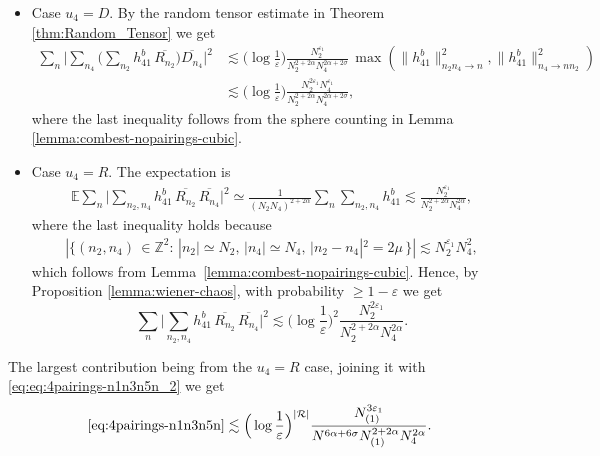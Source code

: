 \documentclass[11pt, xcolor = dvipsnames,reqno
]{amsart}
\theoremstyle{definition}
\theoremstyle{remark}
\begin{document}
    \begin{itemize}
        \item Case $u_4 = D$. By the random tensor estimate in Theorem \ref{thm:Random_Tensor}
        we get
        \begin{align}
            \sum_n \bigg| \sum_{ n_4} \Big( \sum_{n_2} h^b_{41} \,  \overline{R_{n_2}} \Big) \overline{D_{n_4}} \bigg|^2
            & \lesssim
            \Big( \log \frac{1}{\varepsilon} \Big)
            \frac{N_2^{\varepsilon_1}}{N_2^{2 + 2\alpha}N_4^{ 2\alpha + 2\sigma}} \, \max(\big\lVert h^b_{41}  \big\rVert_{n_2n_4 \to n}^2,  \big\lVert h^b_{41}  \big\rVert_{n_4 \to nn_2}^2) \\
            & \lesssim 
            \Big( \log \frac{1}{\varepsilon} \Big) \frac{N_2^{2\varepsilon_1} N_4^{\varepsilon_1}}{N_2^{2 + 2\alpha}N_4^{2\alpha + 2\sigma }}, 
        \end{align}
        where the last inequality follows from the sphere counting in Lemma \ref{lemma:combest-nopairings-cubic}.

        \item Case $u_4 = R$. The expectation is 
        \begin{align}
            \mathbb E \sum_n \Bigg| \sum_{ n_2, n_4} h^b_{41} \,  \overline{R_{n_2}} \, \overline{R_{n_4}} \Bigg|^2 
            \simeq \frac{1}{(N_2 N_4)^{2 + 2\alpha}} \sum_n \sum_{n_2, n_4} h^b_{41} \lesssim \frac{N_2^{\varepsilon_1}}{N_2^{2+2\alpha} N_4^{2\alpha}},
        \end{align}
        where the last inequality holds because
        \begin{align*}
            |\{ (n_2,n_4) \, \in \mathbb{Z}^2 :  \, |n_2| \simeq N_2, \, |n_4| \simeq N_4,  \, |n_2 - n_4|^2 = 2\mu \, \}| \lesssim N_2^{\varepsilon_1} N_4^2, 
        \end{align*}
        which follows from Lemma~\ref{lemma:combest-nopairings-cubic}. 
        Hence, by Proposition \ref{lemma:wiener-chaos}, with probability $\geq 1-\varepsilon$ we get
        \begin{equation}\label{eq:wiener-app4}
            \sum_n \Bigg| \sum_{ n_2, n_4} h^b_{41} \,  \overline{R_{n_2}} \, \overline{R_{n_4}} \Bigg|^2
            \lesssim 
            \Big( \log\frac{1}{\varepsilon} \Big)^2 \frac{N_2^{2\varepsilon_1}}{N_2^{2+2\alpha} N_4^{2\alpha}}.
        \end{equation}
    \end{itemize}
    The largest contribution being from the $u_4 = R$ case, joining it with \eqref{eq:eq:4pairings-n1n3n5n_2} we get
    \begin{align}
        \eqref{eq:4pairings-n1n3n5n}
        \lesssim \Big( \log \frac{1}{\varepsilon} \Big)^{|\mathcal R|} \frac{N_{(1)}^{3\varepsilon_1}}{N^{6\alpha + 6\sigma} N_{(1)}^{2 + 2\alpha} N_{4}^{2\alpha}}.
    \end{align}
\end{document}
